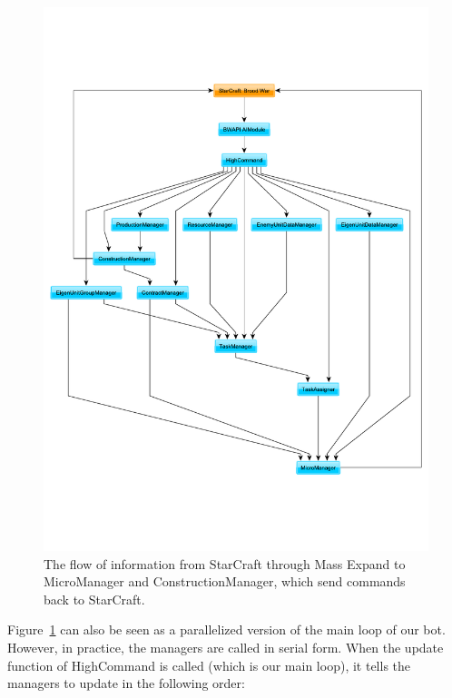 \begin{figure}[htb]
\centering
\includegraphics[width=\textwidth, trim= 0mm 30mm 0mm 30mm, clip]{images/flowofinformation}
\caption{The flow of information from StarCraft through Mass Expand to MicroManager and ConstructionManager, which send commands back to StarCraft.}
\label{fig:flowofinformation}
\end{figure}

Figure~\ref{fig:flowofinformation} can also be seen as a parallelized version of the main loop of our bot. However, in practice, the managers are called in serial form. When the update function of HighCommand is called (which is our main loop), it tells the managers to update in the following order:

